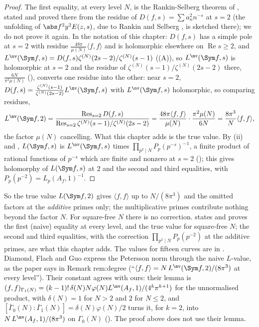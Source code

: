 \begin{proof}
The first equality, at every level $N$, is the Rankin-Selberg theorem of , stated and proved there from the residue of $D(f,s)=\sum a_n^2n^{-s}$ at $s=2$
(the unfolding of $\abs f^2y^2E(z,s)$, due to Rankin \cite{Rankin39} and Selberg \cite{Selberg40}, is sketched there); we do not prove it again. In the notation of this
chapter: $D(f,s)$ has a simple pole at $s=2$ with residue $\frac{48\pi}{\mu(N)}\langle f,f\rangle$ and is holomorphic elsewhere on $\operatorname{Re}s\ge2$, and
$L^{\nv}(\Sym f,s)=D(f,s)\zeta^{(N)}(2s-2)/\zeta^{(N)}(s-1)$ ((A)), so $L^{\nv}(\Sym f,s)$ is holomorphic at $s=2$ and the residue of
$\zeta^{(N)}(s-1)/\zeta^{(N)}(2s-2)$ there, $\frac{6N}{\pi^2\mu(N)}$ (), converts one residue into the other: near $s=2$,
$D(f,s)=\frac{\zeta^{(N)}(s-1)}{\zeta^{(N)}(2s-2)}L^{\nv}(\Sym f,s)$ with $L^{\nv}(\Sym f,s)$ holomorphic, so comparing residues,
\[
L^{\nv}(\Sym f,2)=\frac{\operatorname{Res}_{s=2}D(f,s)}{\operatorname{Res}_{s=2}\zeta^{(N)}(s-1)/\zeta^{(N)}(2s-2)}=\frac{48\pi\langle f,f\rangle}{\mu(N)}\cdot\frac{\pi^2\mu(N)}{6N}=\frac{8\pi^3}N\langle f,f\rangle,
\]
the factor $\mu(N)$ cancelling. What this chapter adds is the true value. By
(ii) and , $L(\Sym f,s)$ is $L^{\nv}(\Sym f,s)$ times $\prod_{p^2\mid N}P_p(p^{-s})^{-1}$, a finite product of rational functions of
$p^{-s}$ which are finite and nonzero at $s=2$ (); this gives holomorphy of $L(\Sym f,s)$ at $2$ and the second and third equalities, with
$P_p(p^{-2})=L_p(A_f,1)^{-1}$.
\end{proof}

So the true value $L(\Sym f,2)$ gives $\langle f,f\rangle$ up to $N/(8\pi^3)$ and the omitted factors at the \emph{additive} primes only; the multiplicative primes contribute nothing beyond the factor $N$. For
square-free $N$ there is no correction.  states and proves the first (naive) equality at every level, and the true value for square-free $N$; the
second and third equalities, with the correction $\prod_{p^2\mid N}P_p(p^{-2})$ at the additive primes, are what this chapter adds. The values for fifteen curves are in . Diamond, Flach and Guo
\cite[Lemma 2.12]{DFG04} express the Petersson norm through the naive $L$-value, as the paper says in Remark rem:degree (``$\langle f,f\rangle=N\,L^{\nv}(\Sym f,2)/(8\pi^3)$ at every level''). Their constant agrees
with ours: their lemma is $(f,f)_{\Gamma_1(N)}=(k-1)!\,\delta(N)N\varphi(N)L^{\nv}(A_f,1)/(4^k\pi^{k+1})$ for the unnormalised product, with $\delta(N)=1$ for $N>2$ and $2$ for $N\le2$, and
$[\bar\Gamma_0(N):\bar\Gamma_1(N)]=\delta(N)\varphi(N)/2$ turns it, for $k=2$, into $N\,L^{\nv}(A_f,1)/(8\pi^3)$ on $\Gamma_0(N)$ (). The proof above does not use their lemma.

